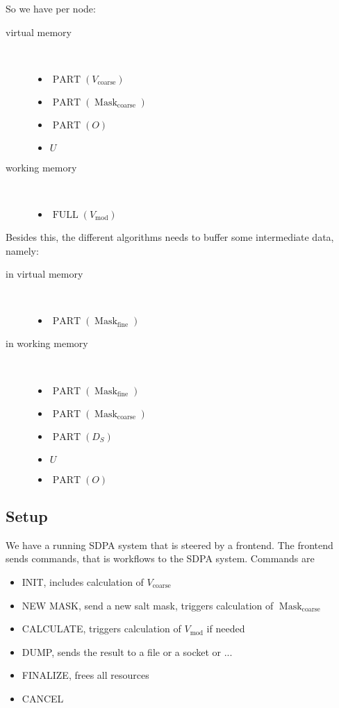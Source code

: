 \documentclass[12pt,a4paper]{article}
\DeclareMathOperator{\mask}{Mask}
\DeclareMathOperator{\fine}{fine}
\DeclareMathOperator{\coarse}{coarse}
\DeclareMathOperator{\vmod}{mod}
\newcommand{\fieldcoarse}{V_{\coarse}}
\newcommand{\velmodel}{V_{\vmod}}
\newcommand{\maskfine}{\mask_{\fine}}
\newcommand{\maskcoarse}{\mask_{\coarse}}
\newcommand{\slantstacks}{D_S}
\newcommand{\outp}{O}
\newcommand{\updatedescr}{U}
\DeclareMathOperator{\oppartof}{PART}
\DeclareMathOperator{\opfull}{FULL}
\newcommand{\parens}[3]{#1#3#2}
\newcommand{\K}[1]{\parens{(}{)}{#1}}
\newcommand{\partof}[1]{\oppartof{}\K{#1}}
\newcommand{\full}[1]{\opfull{}\K{#1}}
\begin{document}
So we have per node:
\begin{description}
\item[virtual memory]~

  \begin{itemize}
  \item $\partof{\fieldcoarse}$
  \item $\partof{\maskcoarse}$
  \item $\partof{\outp}$
  \item $\updatedescr$
  \end{itemize}
\item[working memory]~

  \begin{itemize}
  \item $\full{\velmodel}$
  \end{itemize}
\end{description}

Besides this, the different algorithms needs to buffer some
intermediate data, namely:

\begin{description}
\item[in virtual memory]~

  \begin{itemize}
  \item $\partof{\maskfine}$
  \end{itemize}
\item[in working memory]~

  \begin{itemize}
  \item $\partof{\maskfine}$
  \item $\partof{\maskcoarse}$
  \item $\partof{\slantstacks}$
  \item $\updatedescr$
  \item $\partof{\outp}$
  \end{itemize}
\end{description}


\subsection*{Setup}

We have a running SDPA system that is steered by a frontend. The
frontend sends commands, that is workflows to the SDPA
system. Commands are
\begin{itemize}
\item INIT, includes calculation of $\fieldcoarse$
\item NEW MASK, send a new salt mask, triggers calculation of
  $\maskcoarse$
\item CALCULATE, triggers calculation of $\velmodel$ if needed
\item DUMP, sends the result to a file or a socket or ...
\item FINALIZE, frees all resources
\item CANCEL
\end{itemize}
\end{document}
